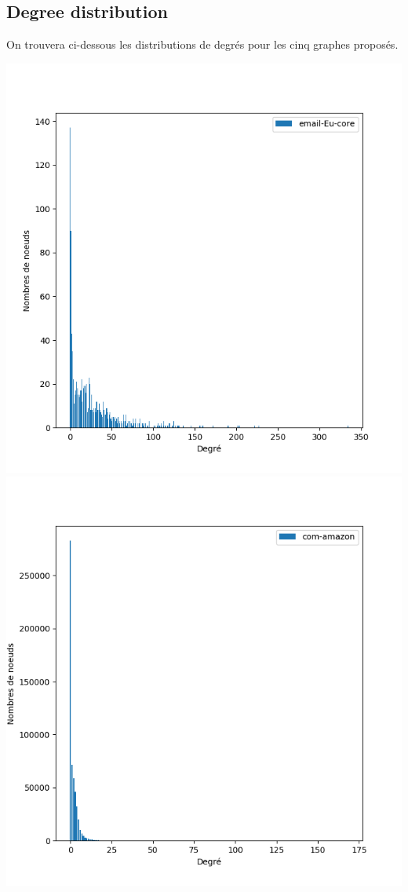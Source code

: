 \documentclass[a4paper]{report}
\begin{document}
\subsection*{Degree distribution}
On trouvera ci-dessous les distributions de degrés pour les cinq graphes proposés.
\begin{center}
  \includegraphics[height=.25\paperwidth]{assets/email-EU-core-dist.png}
  \includegraphics[height=.25\paperwidth]{assets/com-amazon-dist.png}

\end{center}
\end{document}
